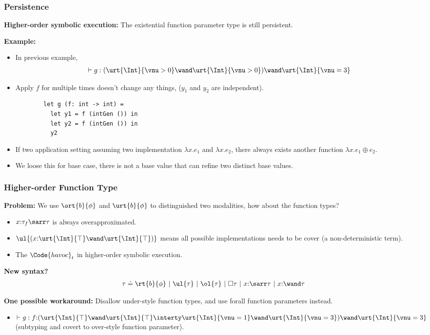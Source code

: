 \begin{frame}[fragile]
    \frametitle{Persistence}
    
    \textbf{Higher-order symbolic execution:} The existential function parameter type is still persistent.
    
    \textbf{Example:} 
    \begin{itemize}
        \item In previous example,
        \begin{align*}
            \vdash g : (\urt{\Int}{\vnu > 0}\wand\urt{\Int}{\vnu > 0})\wand\urt{\Int}{\vnu = 3}
        \end{align*}
        \item Apply $f$ for multiple times doesn't change any things, ($y_1$ and $y_2$ are independent).
        \begin{verbatim}
        let g (f: int -> int) =
          let y1 = f (intGen ()) in
          let y2 = f (intGen ()) in
          y2
        \end{verbatim}
        \item If two application setting assuming two implementation $\lambda x.e_1$ and $\lambda x.e_2$, there always exists another function $\lambda x.e_1 \oplus e_2$.
        \item We loose this for base case, there is not a base value that can refine two distinct base values.
    \end{itemize}
    
    \end{frame}

\begin{frame}[fragile]
    \frametitle{Higher-order Function Type}

\textbf{Problem:} We use $\ort{b}{\phi}$ and $\urt{b}{\phi}$ to distinguished two modalities, how about the function types?

\begin{itemize}
    \item $x{:}\tau_f\sarr\tau$ is always overapproximated.
    \item $\ul{(x{:}\urt{\Int}{\top}\wand\urt{\Int}{\top})}$ means all possible implementations needs to be cover (a non-deterministic term).
    \item The $\Code{havoc}_{t}$ in higher-order symbolic execution.
\end{itemize}

\textbf{New syntax?}
\begin{align*}
    \tau \doteq \rt{b}{\phi} ~|~ \ul{\tau} ~|~ \ol{\tau} ~|~ \Box \tau ~|~ x{:}\sarr\tau ~|~ x{:}\wand\tau
\end{align*}

\textbf{One possible workaround:} Disallow under-style function types, and use forall function parameters instead.
\begin{itemize}
    \item $\vdash g : f{:}(\urt{\Int}{\top} \wand \urt{\Int}{\top} \interty \urt{\Int}{\vnu = 1} \wand \urt{\Int}{\vnu = 3}) \wand \urt{\Int}{\vnu = 3}$ (subtyping and covert to over-style function parameter).
\end{itemize}
    
\end{frame}


